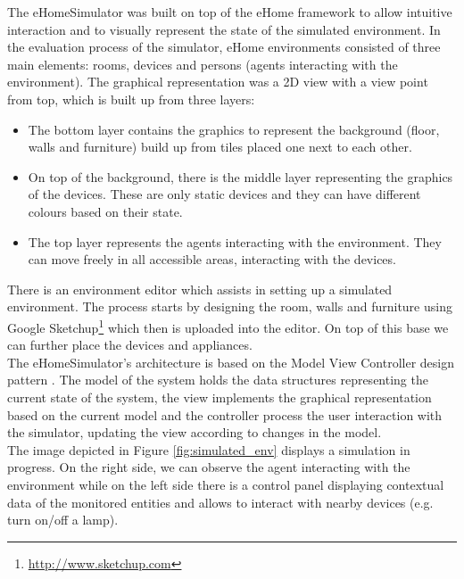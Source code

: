 The eHomeSimulator was built on top of the eHome framework to allow intuitive interaction and to visually represent the state of the simulated environment. In the evaluation process of the simulator, eHome environments consisted of three main elements: rooms, devices and persons (agents interacting with the environment). The graphical representation was a 2D view with a view point from top, which is built up from three layers:
\begin{itemize}
	\item The bottom layer contains the graphics to represent the background (floor, walls and furniture) build up from tiles placed one next to each other.
	\item On top of the background, there is the middle layer representing the graphics of the devices. These are only static devices and they can have different colours based on their state.
	\item The top layer represents the agents interacting with the environment. They can move freely in all accessible areas, interacting with the devices.
\end{itemize}

There is an environment editor which assists in setting up a simulated environment. The process starts by designing the room, walls and furniture using Google Sketchup\footnote{\url{http://www.sketchup.com}} which then is uploaded into the editor. On top of this base we can further place the devices and appliances.\\

The eHomeSimulator's architecture is based on the Model View Controller design pattern \cite{erich1995design}. The model of the system holds the data structures representing the current state of the system, the view implements the graphical representation based on the current model and the controller process the user interaction with the simulator, updating the view according to changes in the model.\\

The image depicted in Figure \ref{fig:simulated_env} displays a simulation in progress. On the right side, we can observe the agent interacting with the environment while on the left side there is a control panel displaying contextual data of the monitored entities and allows to interact with nearby devices (e.g. turn on/off a lamp).

